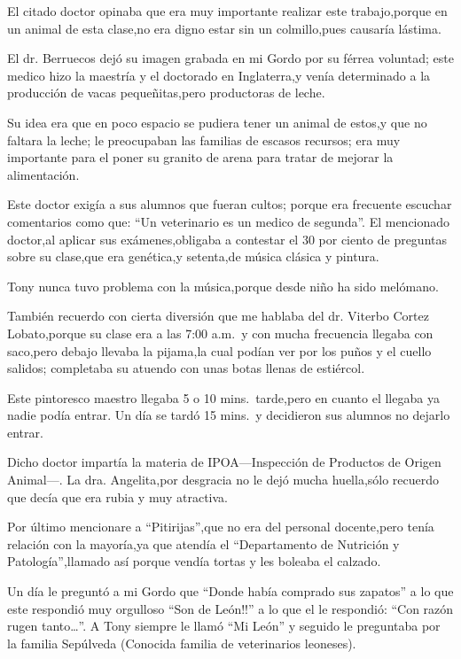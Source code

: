 \documentclass[letterpaper,12pt]{book}
\begin{document}
El  citado doctor opinaba que era muy importante realizar este trabajo,porque en un animal de esta clase,no era digno estar sin un colmillo,pues causaría lástima.

El dr. Berruecos dejó su imagen grabada en mi Gordo por su férrea voluntad; este medico hizo la maestría y el doctorado en Inglaterra,y venía determinado a la producción de vacas pequeñitas,pero productoras de leche. 

Su idea era que en poco espacio se pudiera tener un animal de estos,y que no faltara la leche; le preocupaban las familias de escasos recursos; era muy importante para el poner su granito de arena para tratar de mejorar la alimentación.

Este doctor exigía a sus alumnos que fueran cultos; porque era frecuente escuchar comentarios como que: ``Un veterinario es un medico de segunda''.
El mencionado doctor,al aplicar sus exámenes,obligaba a contestar el 30 por ciento de preguntas sobre su clase,que era genética,y setenta,de música clásica y pintura.

Tony nunca tuvo problema con la música,porque desde niño ha sido melómano. 

También recuerdo con cierta diversión que me hablaba del dr. Viterbo Cortez Lobato,porque su clase era a las 7:00 a.m.\ y con mucha frecuencia llegaba con saco,pero debajo llevaba la pijama,la cual podían  ver por los puños y el cuello salidos; completaba su atuendo con unas botas llenas de estiércol.

Este pintoresco maestro llegaba 5 o 10 mins.\ tarde,pero en cuanto el llegaba ya nadie podía entrar. Un día se tardó 15 mins.\ y decidieron sus alumnos no dejarlo entrar. 

Dicho doctor impartía la materia de IPOA---Inspección de Productos de Origen Animal---.
La dra. Angelita,por desgracia no le dejó mucha huella,sólo recuerdo que decía que era rubia y muy atractiva. 

Por último mencionare a ``Pitirijas'',que no era del personal docente,pero tenía relación con la mayoría,ya que atendía el ``Departamento de Nutrición y Patología'',llamado así porque vendía tortas y les boleaba el calzado.

Un día le preguntó a mi Gordo que ``Donde había comprado sus zapatos'' a lo que este respondió muy orgulloso ``Son de León!!'' a lo que el le respondió:
``Con razón rugen tanto\ldots''.  A Tony siempre le llamó ``Mi León'' y seguido le preguntaba por la familia Sepúlveda (Conocida familia de veterinarios leoneses).
\end{document}

